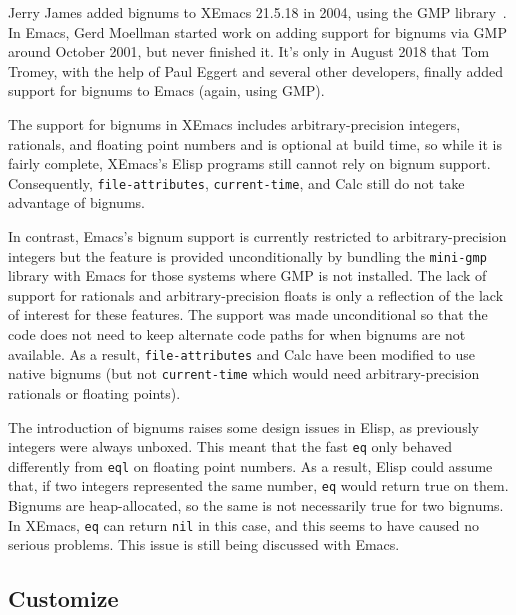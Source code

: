 \documentclass[format=acmsmall, review=false, screen=true]{acmart}
\newcommand \Elisp {Elisp}
\begin{document}
Jerry James added bignums to XEmacs 21.5.18 in 2004, using the GMP
library~\cite{GMP}.  In Emacs, Gerd Moellman started work on adding support
for bignums via GMP around October 2001, but never finished it.  It's only
in August 2018 that Tom Tromey, with the help of Paul Eggert and several
other developers, finally added support for bignums to Emacs (again, using
GMP).

The support for bignums in XEmacs includes arbitrary-precision integers,
rationals, and floating point numbers and is optional at build time, so
while it is fairly complete, XEmacs's \Elisp{} programs still cannot rely on
bignum support.  Consequently, \texttt{file-attributes},
\texttt{current-time}, and Calc still do not take advantage of bignums.

In contrast, Emacs's bignum support is currently restricted to
arbitrary-precision integers but the feature is provided unconditionally by
bundling the \texttt{mini-gmp} library with Emacs for those systems where
GMP is not installed.  The lack of support for rationals and
arbitrary-precision floats is only a reflection of the lack of interest for
these features.  The support was made unconditional so that the code does
not need to keep alternate code paths for when bignums are not available.
As a result, \texttt{file-attributes} and Calc have been modified to use
native bignums (but not \texttt{current-time} which would need
arbitrary-precision rationals or floating points).

The introduction of bignums raises some design issues in \Elisp, as
previously integers were always unboxed.  This meant that the fast
\texttt{eq} only behaved differently from \texttt{eql} on floating point
numbers.  As a result, \Elisp{} could assume that, if two integers
represented the same number, \texttt{eq} would return true on them.
Bignums are heap-allocated, so the same is not necessarily true for two
bignums.  In XEmacs, \texttt{eq} can return \texttt{nil} in this case, and
this seems to have caused no serious problems.
This issue is still being discussed with Emacs.

\subsection{Customize}


\end{document}
